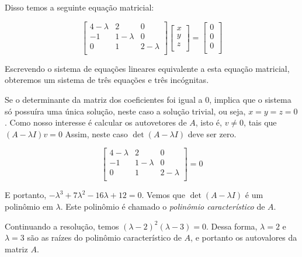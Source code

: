 \documentclass[oneside,a4paper,12pt]{article}
\begin{document}
Disso temos a seguinte equação matricial:

$$\left[
\begin{array}{ccc}
4 - \lambda	&	2	&	0\\
-1	&	1 - \lambda	&	0 \\
0	&	1	&	2 - \lambda	\\
\end{array}
\right] \left[
\begin{array}{c}
x	\\
y	\\
z	\\
\end{array}
\right] = \left[
\begin{array}{c}
0	\\
0	\\
0	\\
\end{array}
\right]$$

Escrevendo o sistema de equações lineares equivalente a esta equação matricial, obteremos um sistema de três equações e três incógnitas.

Se o determinante da matriz dos coeficientes foi igual a 0, implica que o sistema só possuíra uma única solução, neste caso a solução trivial, ou seja, $x=y=z=0$. Como nosso interesse é calcular os autovetores de $A$, isto é, $v \neq 0$, tais que $(A - \lambda I)v = 0$ Assim, neste caso $\det(A - \lambda I)$ deve ser zero.

$$\left[
\begin{array}{ccc}
4 - \lambda	&	2	&	0\\
-1	&	1 - \lambda	&	0 \\
0	&	1	&	2 - \lambda	\\
\end{array}
\right] = 0 $$

E portanto, $-\lambda ^3 + 7 \lambda ^2 - 16 \lambda + 12 = 0$. Vemos que $\det(A - \lambda I)$ é um polinômio em $\lambda$. Este polinômio é chamado o \emph{polinômio característico} de $A$.

Continuando a resolução, temos $(\lambda - 2)^2(\lambda -3) = 0$. Dessa forma, $\lambda = 2$ e $\lambda = 3$ são as raízes do polinômio característico de $A$, e portanto os autovalores da matriz $A$.
\end{document}
